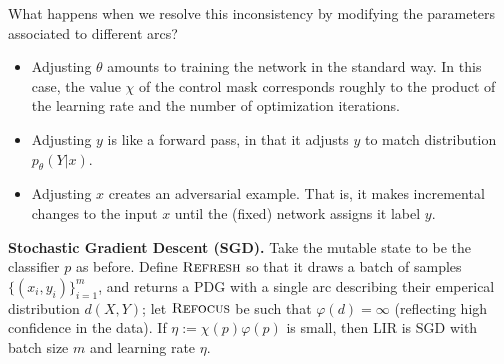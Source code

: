What happens when we resolve this inconsistency
by modifying the parameters associated to different arcs?

\begin{itemize}
    \item Adjusting $\theta$
    amounts to training the network in the standard way.
        In this case, the value $\chi$ of the control mask corresponds roughly
        to the product of the learning rate and the number of optimization iterations.

    \item Adjusting $y$
    is like a  forward pass, in that it adjusts $y$ to match distribution $p_\theta(Y|x)$.

    \item Adjusting $x$
    creates an adversarial example.
    That is, it makes incremental changes to the input $x$
        until the (fixed) network assigns it label $y$.
\end{itemize}

\textbf{Stochastic Gradient Descent (SGD).} \label{sec:SGD}
Take the mutable state to be the classifier $p$ as before.
Define $\textsc{Refresh}$ so that it draws a batch of samples $\{(x_i,y_i)\}_{i=1}^m$,
and returns a PDG with a single arc describing their emperical distribution $d(X,Y)$;
let $\textsc{Refocus}$ be such that $\varphi(d) = \infty$
    (reflecting high confidence in the data).
If $\eta := \chi(p) \varphi(p)$ is small, then
    LIR is SGD with batch size $m$ and learning rate $\eta$.


